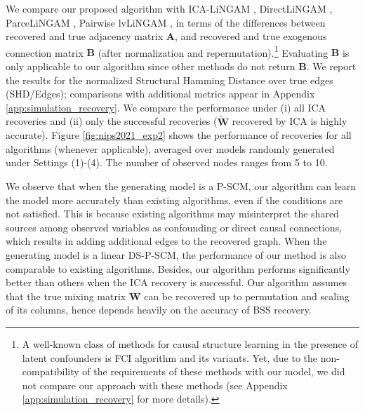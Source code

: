 \documentclass[12pt]{article}
\newcommand{\bA}{\mathbf{A}}
\newcommand{\bB}{\mathbf{B}}
\newcommand{\bW}{\mathbf{W}}
\begin{document}
We compare our proposed algorithm with ICA-LiNGAM \citep{shimizu2006linear}, DirectLiNGAM \citep{shimizu2011directlingam}, ParceLiNGAM \citep{tashiro2014parcelingam}, Pairwise lvLiNGAM \citep{entner2010discovering}, in terms of the differences between recovered and true adjacency matrix $\bA$, and recovered and true exogenous connection matrix $\bB$ (after normalization and repermutation).\footnote{A well-known class of methods for causal structure learning in the presence of latent confounders is FCI algorithm \citep{spirtes2000causation} and its variants. Yet, due to the non-compatibility of the requirements of these methods with our model, we did not compare our approach with these methods (see Appendix \ref{app:simulation_recovery} for more details).} Evaluating $\bB$ is only applicable to our algorithm since other methods do not return $\bB$. We report the results for the normalized Structural Hamming Distance over true edges (SHD/Edges); comparisons with additional metrics appear in Appendix \ref{app:simulation_recovery}.
We compare the performance under (i) all ICA recoveries and (ii) only the successful recoveries ($\tilde{\bW}$ recovered by ICA is highly accurate). Figure \ref{fig:nips2021_exp2} shows the performance of recoveries for all algorithms (whenever applicable), averaged over models randomly generated under Settings (1)-(4). The number of observed nodes ranges from 5 to 10.

We observe that when the generating model is a P-SCM, our algorithm can learn the model more accurately than existing algorithms, even if the conditions are not satisfied. This is because existing algorithms may misinterpret the shared sources among observed variables as confounding or direct causal connections, which results in adding additional edges to the recovered graph. When the generating model is a linear DS-P-SCM, the performance of our method is also comparable to 
existing algorithms. Besides, our algorithm performs significantly better than others when the ICA recovery is successful. Our algorithm assumes that the true mixing matrix $\bW$ can be recovered up to permutation and scaling of its columns, hence depends heavily on the accuracy of BSS recovery. 
\end{document}
